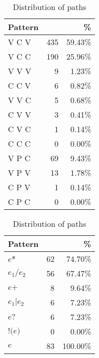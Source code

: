 \documentclass[runningheads]{llncs}
\newcommand{\ntextnumero}{{\fontfamily{txr}\selectfont \textnumero}\xspace}
\begin{document}
\begin{table}[t]
	\begin{minipage}[b]{0.47\linewidth}
		\centering
		\caption{Distribution of triple patterns (C: Constant, V: Variable, P: Path). \label{tab:Pattern}}
		\begin{tabular}{l@{\hskip 0.2in}r@{\hskip 0.2in}r}    \toprule
			\textbf{Pattern} & \textbf{\ntextnumero} & \textbf{\%} \\    \midrule
			V C V   & 435      & 59.43\%    \\
			V C C   & 190      & 25.96\%    \\
			V V V   & 9        & 1.23\%     \\
			C C V   & 6        & 0.82\%     \\
			V V C   & 5        & 0.68\%     \\
			C V V   & 3        & 0.41\%     \\
			C V C   & 1        & 0.14\%     \\
			C C C   & 0        & 0.00\%     \\    \midrule
			V P C   & 69       & 9.43\%     \\
			V P V   & 13       & 1.78\%     \\
			C P V   & 1        & 0.14\%     \\
			C P C   & 0        & 0.00\%     \\    \bottomrule
		\end{tabular}
	\end{minipage}
	\hfill
	\begin{minipage}[b]{0.47\linewidth}
		\centering
		\caption{Distribution of paths\label{tab:Path}}
		\begin{tabular}{l@{\hskip 0.2in}r@{\hskip 0.2in}r}    \toprule
			\textbf{Pattern}      & \textbf{\ntextnumero} & \textbf{\%} \\    \midrule
			$e\texttt{*}$   & 62       & 74.70\%     \\
			$e_1 \texttt{/} e_2$  & 56       & 67.47\%    \\
			$e\texttt{+} $   & 8        & 9.64\%     \\
			$e_1 \texttt{|} e_2$  & 6        & 7.23\%     \\
			$e\texttt{?}$    & 6        & 7.23\%     \\
			$\texttt{!(}e\texttt{)}$ & 0        & 0.00\%        \\ \midrule
			$e$ & 83 & 100.00\% \\
			\bottomrule
		\end{tabular}
	\end{minipage}
\end{table}
\end{document}
